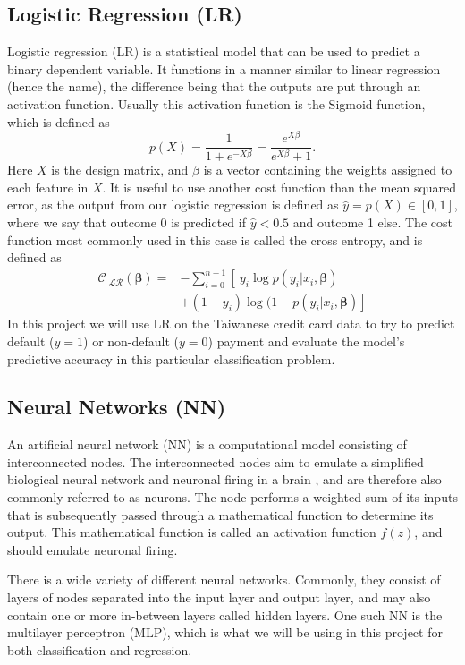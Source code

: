 \documentclass[a4paper, 11pt, twocolumn]{article}
\begin{document}
\subsection{Logistic Regression (LR)}
Logistic regression (LR)  is a statistical model that can be used to predict a 
binary dependent variable. It functions in a manner similar to linear regression 
(hence the name), the difference being that the outputs are put through an 
activation function. Usually this activation function is the Sigmoid function, 
which is defined as
\begin{equation}
p(X) = \frac{1}{1 + e^{-X \beta}} =\frac{e^{X \beta}}{e^{X \beta}+1}.
\label{sigmoid}
\end{equation}
Here $X$ is the design matrix, and $\beta$ is a vector containing the weights 
assigned to each
feature in $X$. It is useful to use another cost function than the mean squared 
error, as the output
from our logistic regression is defined as $\hat{y}=p(X)\in [0, 1]$, where we 
say that outcome 0 is predicted if $\hat{y}< 0.5$ and outcome 1 else. The cost 
function most commonly used in this case is called the cross entropy, and is 
defined as
\begin{align}
\mathcal{C_\text{ LR}}(\bm{\beta}) =& -\sum_{i=0}^{n-1} \left[\  y_i\log p(y_i|x_i, \bm{\beta}) \right. \nonumber\\
 &\left.+ (1-y_i)\log(1-p(y_i|x_i,\bm{\beta})    \right] 
\end{align}
In this project we will use LR on the Taiwanese credit card data to try to predict 
default ($y=1$) or non-default ($y=0$) payment and evaluate the model's predictive 
accuracy in this particular classification problem.

\subsection{Neural Networks (NN)}

An artificial neural network (NN) is a computational model consisting of 
interconnected nodes. The interconnected nodes aim to emulate a simplified 
biological neural network and neuronal firing in a brain , and are therefore 
also commonly referred to as neurons.  The node performs a weighted sum of its 
inputs that is subsequently passed through a mathematical function to determine 
its output. This mathematical function is called an activation function $f(z)$, 
and should emulate neuronal firing. 

There is a wide variety of different neural networks. Commonly, they consist of 
layers of nodes separated into the input layer and output layer, and may also 
contain one or more in-between layers called hidden layers. One such NN is the 
multilayer perceptron (MLP), which is what we will be using in this project for 
both classification and regression.
\end{document}
